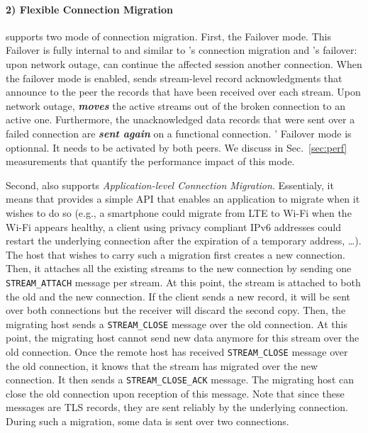 
\paragraph*{2) Flexible Connection Migration}
\tcpls supports two mode of connection migration. First, the Failover mode.
This Failover is fully internal to \tcpls and similar to \quic's connection
migration and \mptcp's failover: upon network outage, \tcpls can continue
the affected session another \tcp connection. When the failover mode is
enabled, \tcpls sends stream-level record acknowledgments that announce to the peer the records that have been received over each stream. 
Upon network outage, \tcpls \textbf{\textit{moves}} the active streams out of
the broken \tcp connection to an active one. Furthermore, the
unacknowledged data records that were sent over
a failed \tcp connection are \textbf{\textit{sent again}} on a functional \tcp connection.
\tcpls' Failover mode is optionnal. It needs to be activated by both peers.
We discuss in Sec.~\ref{sec:perf} measurements that quantify the performance impact of this mode. 

Second, \tcpls also supports \textit{Application-level Connection
 Migration}. Essentialy, it means that \tcpls provides a
simple API that enables an application to migrate when it wishes to do
so (e.g., a smartphone could migrate from LTE to Wi-Fi when the Wi-Fi appears healthy, a client using privacy compliant IPv6 addresses \cite{rfc4941} could restart the underlying \tcp connection after the expiration of a temporary address, \ldots). The host that wishes to carry such a migration first creates a
new \tcp connection. Then, it attaches all the existing streams to the new connection by sending one \texttt{STREAM\_ATTACH} message per stream. At this point, the stream is attached to both the old and the new \tcp connection. If the client sends a new record, it will be sent over both connections but the receiver will discard the second copy. Then, the migrating host sends a \texttt{STREAM\_CLOSE} message over the old \tcp connection. At this point, the migrating host cannot send new data anymore for this stream over the old connection. Once the remote host has received \texttt{STREAM\_CLOSE} message over the old \tcp
connection, it knows that the stream has migrated over the new \tcp connection.
It then sends a \texttt{STREAM\_CLOSE\_ACK} message. The migrating host can close the old connection upon reception of this message. Note that since these messages are TLS records, they are sent reliably by the underlying \tcp connection. During such a migration, some data is sent over two connections.

